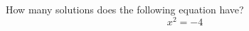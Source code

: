 \documentclass{ximera}
\author{David Kish}
\begin{document}
\begin{exercise}
How many solutions does the following equation have? \\
\[
x^2=-4
\]
\begin{multipleChoice}  
\end{multipleChoice}  
\end{exercise}
\end{document}
